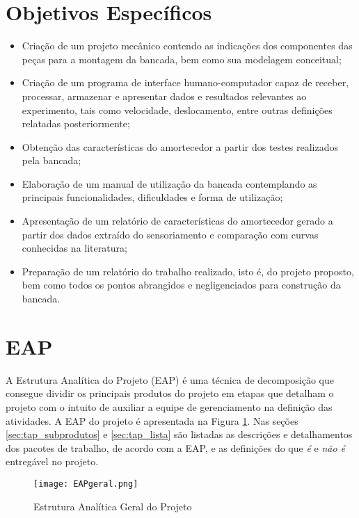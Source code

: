 	\section{Objetivos Específicos}
	\label{sec:tap_objetivos_especificos}

		\begin{itemize}
			\item Criação de um projeto mecânico contendo as indicações dos componentes das peças para a montagem da bancada, bem como sua modelagem conceitual;
			\item Criação de um programa de interface humano-computador capaz de receber, processar, armazenar e apresentar dados e resultados relevantes ao experimento, tais como velocidade, deslocamento, entre outras definições relatadas posteriormente;
			\item Obtenção das características do amortecedor a partir dos testes realizados pela bancada;
			\item Elaboração de um manual de utilização da bancada contemplando as principais funcionalidades, dificuldades e forma de utilização;
			\item Apresentação de um relatório de características do amortecedor gerado a partir dos dados extraído do sensoriamento e comparação com curvas conhecidas na literatura;
			\item Preparação de um relatório do trabalho realizado, isto é, do projeto proposto, bem como todos os pontos abrangidos e negligenciados para construção da bancada.
		\end{itemize}
		

	\section{EAP}
	\label{sec:tap_EAP}

		A Estrutura Analítica do Projeto (EAP) é uma técnica de decomposição que consegue dividir os principais produtos do projeto em etapas que detalham o projeto com o intuito de auxiliar a equipe de gerenciamento na definição das atividades. A EAP do projeto é apresentada na Figura \ref{EAP}. Nas seções \ref{sec:tap_subprodutos} e \ref{sec:tap_lista} são listadas as descrições e detalhamentos dos pacotes de trabalho, de acordo com a EAP, e as definições do que \textit{é} e \textit{não é} entregável no projeto.

		\begin{figure}[!h]
			\centering
			\texttt{[image: EAPgeral.png]}
			\caption{Estrutura Analítica Geral do Projeto}
			\label{EAP}
		\end{figure}


